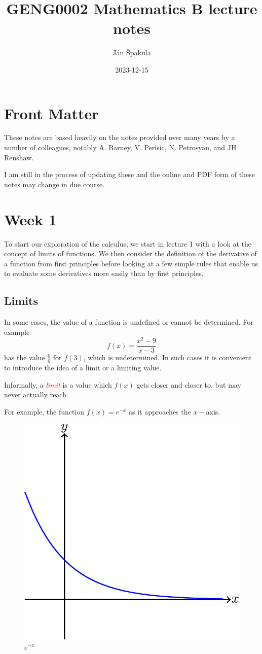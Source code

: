 \documentclass[
  11pt,
  oneside]{book}
\title{GENG0002 Mathematics B lecture notes}
\author{Ján Špakula}
\date{2023-12-15}
\newcommand{\slide}{}
\theoremstyle{definition}
\theoremstyle{definition}
\theoremstyle{definition}
\theoremstyle{definition}
\theoremstyle{remark}
\begin{document}
\maketitle

{
\setcounter{tocdepth}{1}
\tableofcontents
}
\chapter*{Front Matter}\label{front-matter}

These notes are based heavily on the notes provided over many years by a number of colleagues, notably A. Barney, V. Perisic, N. Petrosyan, and JH Renshaw.

I am still in the process of updating these and the online and PDF form of these notes may change in due course.

\chapter{Week 1}\label{week-1}

To start our exploration of the calculus, we start in lecture 1 with a look at the concept of limits of functions. We then consider the definition of the derivative of a function from first principles before looking at a few simple rules that enable us to evaluate some derivatives more easily than by first principles.
\slide

\section{Limits}\label{lecture-one}

In some cases, the value of a function is undefined or cannot be determined. For example
\[
f(x) = \frac{x^2-9}{x-3}\tag{1}
\]
has the value \(\frac00\) for \(f(3)\), which is undetermined. In such cases it is convenient to introduce the idea of a limit or a limiting value.

Informally, a \textcolor{red}{\em limit} is a value which \(f(x)\) gets closer and closer to, but may never actually reach.

\slide

For example, the function \(f(x) = e^{-x}\) as it approaches the \(x-\)axis.

\begin{figure}

{\centering \includegraphics[width=0.4\linewidth]{tikztopng-figure0} 

}

\caption{$e^{-x}$}\label{fig:unnamed-chunk-3}
\end{figure}
\end{document}
